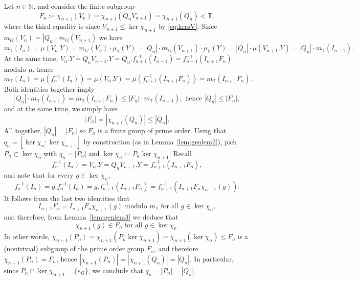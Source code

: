 \documentclass{amsart}
\numberwithin{equation}{subsection}
\theoremstyle{remark}
\begin{document}
Let \(n\in\mathbb{N}\), and consider the finite subgroup
\[F_{n}\coloneqq\chi_{n+1}\left(V_{n}\right)=\chi_{n+1}\left(Q_{n}V_{n+1}\right)=\chi_{n+1}\left(Q_{n}\right)<\mathbb{T},\]
where the third equality is since \(V_{n+1}\leq\ker\chi_{n+1}\) by \eqref{eq:kersV}. Since \(m_{G}\left(V_{n}\right)=\left|Q_{n}\right|\cdot m_{G}\left(V_{n+1}\right)\) we have
\[m_{\mathbb{T}}\left(I_{n}\right)=\mu\left(V_{n}.Y\right)=m_{G}\left(V_{n}\right)\cdot\mu_{Y}\left(Y\right)=\left|Q_{n}\right|\cdot m_{G}\left(V_{n+1}\right)\cdot\mu_{Y}\left(Y\right)=\left|Q_{n}\right|\cdot\mu\left(V_{n+1}.Y\right)=\left|Q_{n}\right|\cdot m_{\mathbb{T}}\left(I_{n+1}\right).\]
At the same time, \(V_{n}.Y=Q_{n}V_{n+1}.Y=Q_{n}.f_{n+1}^{-1}\left(I_{n+1}\right)=f_{n+1}^{-1}\left(I_{n+1}F_{n}\right)\) modulo \(\mu\), hence
\[m_{\mathbb{T}}\left(I_{n}\right)=\mu\left(f_{n}^{-1}\left(I_{n}\right)\right)=\mu\left(V_{n}.Y\right)=\mu\left(f_{n+1}^{-1}\left(I_{n+1}F_{n}\right)\right)=m_{\mathbb{T}}\left(I_{n+1}F_{n}\right).\]
Both identities together imply
\[\left|Q_{n}\right|\cdot m_{\mathbb{T}}\left(I_{n+1}\right)=m_{\mathbb{T}}\left(I_{n+1}F_{n}\right)\leq\left|F_{n}\right|\cdot m_{\mathbb{T}}\left(I_{n+1}\right),\text{ hence }\left|Q_{n}\right|\leq\left|F_{n}\right|,\]
and at the same time, we simply have
\[\left|F_{n}\right|=\left|\chi_{n+1}\left(Q_{n}\right)\right|\leq\left|Q_{n}\right|.\]
All together, \(\left|Q_{n}\right|=\left|F_{n}\right|\) so \(F_{n}\) is a finite group of prime order. Using that \(q_{n}=\left[\ker\chi_{n}:\ker\chi_{n+1}\right]\) by construction (as in Lemma~\ref{lem:genlem2}), pick \(P_{n}\subset\ker\chi_{n}\) with \(q_{n}=\left|P_{n}\right|\) and \(\ker\chi_{n}\coloneqq P_{n}\ker\chi_{n+1}\). Recall
\[f_{n}^{-1}\left(I_{n}\right)=V_{n}.Y=Q_{n}V_{n+1}.Y=f_{n+1}^{-1}\left(I_{n+1}F_{n}\right),\]
and note that for every \(g\in\ker\chi_{n}\),
\[f_{n}^{-1}\left(I_{n}\right)=g.f_{n}^{-1}\left(I_{n}\right)=g.f_{n+1}^{-1}\left(I_{n+1}F_{n}\right)=f_{n+1}^{-1}\left(I_{n+1}F_{n}\chi_{n+1}\left(g\right)\right).\]
It follows from the last two identities that
\[I_{n+1}F_{n}=I_{n+1}F_{n}\chi_{n+1}\left(g\right)\text{ modulo }m_{\mathbb{T}}\text{ for all }g\in\ker\chi_{n},\]
and therefore, from Lemma~\ref{lem:genlem3} we deduce that
\[\chi_{n+1}\left(g\right)\in F_{n}\text{ for all }g\in\ker\chi_{n}.\]
In other words, \(\chi_{n+1}\left(P_{n}\right)=\chi_{n+1}\left(P_{n}\ker\chi_{n+1}\right)=\chi_{n+1}\left(\ker\chi_{n}\right)\leq F_{n}\) is a (nontrivial) subgroup of the prime order group \(F_{n}\), and therefore \(\chi_{n+1}\left(P_{n}\right)=F_{n}\), hence \(\left|\chi_{n+1}\left(P_{n}\right)\right|=\left|\chi_{n+1}\left(Q_{n}\right)\right|=\left|Q_{n}\right|\). In particular, since \(P_{n}\cap\ker\chi_{n+1}=\{e_{G}\}\), we conclude that \(q_{n}=\left|P_{n}\right|=\left|Q_{n}\right|\).
\end{document}
